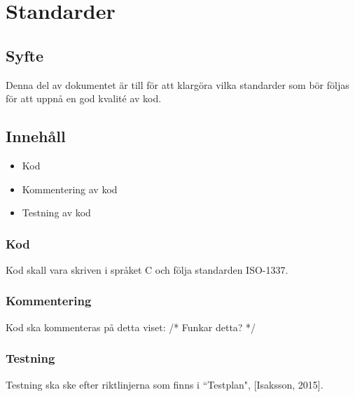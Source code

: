 \section{Standarder}

\subsection{Syfte}
Denna del av dokumentet är till för att klargöra vilka standarder som bör följas för att uppnå en god kvalité av kod.

\subsection{Innehåll}
\begin{itemize}
\item Kod
\item Kommentering av kod
\item Testning av kod
\end{itemize}

\subsubsection{Kod}
Kod skall vara skriven i språket C och följa standarden ISO-1337.

\subsubsection{Kommentering}
Kod ska kommenteras på detta viset:
/* Funkar detta? */

\subsubsection{Testning}
Testning ska ske efter riktlinjerna som finns i ``Testplan", [Isaksson, 2015]. 
